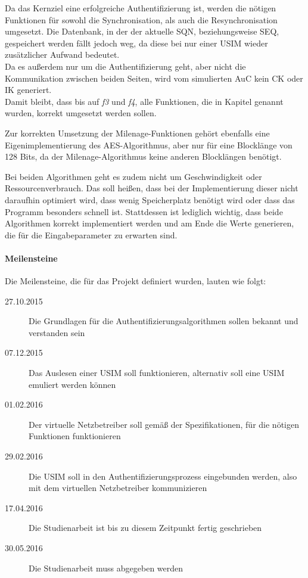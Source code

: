  Da das Kernziel eine erfolgreiche Authentifizierung ist, werden die nötigen Funktionen
 für sowohl die Synchronisation, als auch die Resynchronisation umgesetzt. Die Datenbank,
 in der der aktuelle SQN, beziehungsweise SEQ, gespeichert werden fällt jedoch weg, da
 diese bei nur einer USIM wieder zusätzlicher Aufwand bedeutet. \\
 Da es außerdem nur um die Authentifizierung geht, aber nicht die Kommunikation zwischen
 beiden Seiten, wird vom simulierten AuC kein CK oder IK generiert. \\
 Damit bleibt, dass bis auf \emph{f3} und \emph{f4}, alle Funktionen, die in Kapitel 
 genannt wurden, korrekt umgesetzt werden sollen.
 
 Zur korrekten Umsetzung der Milenage-Funktionen gehört ebenfalls eine Eigen\-implementierung
 des AES-Algorithmus, aber nur für eine Blocklänge von 128 Bits, da der Milenage-Algorithmus
 keine anderen Blocklängen benötigt.
 
 Bei beiden Algorithmen geht es zudem nicht um Geschwindigkeit oder Ressourcenverbrauch.
 Das soll heißen, dass bei der Implementierung dieser nicht daraufhin optimiert wird, dass wenig
 Speicherplatz benötigt wird oder dass das Programm besonders schnell ist. Stattdessen ist lediglich
 wichtig, dass beide Algorithmen korrekt implementiert werden und am Ende die Werte generieren,
 die für die Eingabeparameter zu erwarten sind.
 
 \paragraph{Meilensteine} Die Meilensteine, die für das Projekt definiert wurden, lauten wie folgt:
 \begin{description}
 \item [27.10.2015] Die Grundlagen für die Authentifizierungs\-algorithmen sollen bekannt und verstanden sein
 \item [07.12.2015] Das Auslesen einer USIM soll funktionieren, alternativ soll eine USIM emuliert werden können
 \item [01.02.2016] Der virtuelle Netzbetreiber soll gemäß der Spezifikationen, für die nötigen Funktionen funktionieren
 \item [29.02.2016] Die USIM soll in den Authentifizierungsprozess eingebunden werden, also mit dem virtuellen Netzbetreiber kommunizieren
 \item [17.04.2016] Die Studienarbeit ist bis zu diesem Zeitpunkt fertig geschrieben
 \item [30.05.2016] Die Studienarbeit muss abgegeben werden
 \end{description}
 
